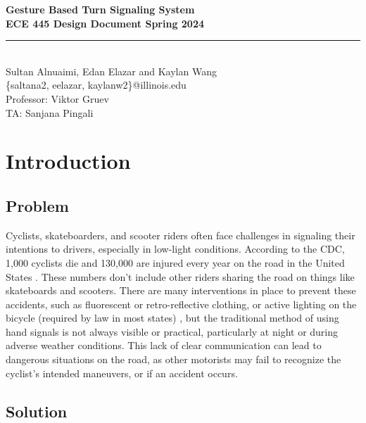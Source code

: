 \documentclass[12pt]{article}
\begin{document}
\begin{titlepage}
\centering
{}
{\LARGE\textbf{Gesture Based Turn Signaling System }}\\[1cm] 
{\large\textbf{ECE 445 Design Document Spring 2024}}\\[0.3cm]
\rule{\textwidth}{1pt}\\
{\Large Sultan Alnuaimi, Edan Elazar and Kaylan Wang}\\[0.5cm] 
{\small \{saltana2, eelazar, kaylanw2\}@illinois.edu}\\[0.5cm] 
{\small Professor: Viktor Gruev}\\[0.5cm]
{\small TA: Sanjana Pingali}\\[1cm]

\end{titlepage} 

\tableofcontents 
\newpage
\section{Introduction}
\subsection{Problem}
Cyclists, skateboarders, and scooter riders often face 
challenges in signaling their intentions to drivers,
especially in low-light conditions. According to the CDC, 
1,000 cyclists die and 130,000 are injured every year on 
the road in the United States \cite{CDC2024BicycleSafety}. 
These numbers don’t include other riders sharing the road on 
things like skateboards and scooters. There are many interventions 
in place to prevent these accidents, such as fluorescent or 
retro-reflective clothing, or active lighting on the bicycle 
(required by law in most states) \cite{CDC2024BicycleSafety}, 
but the traditional method of using hand signals is not always 
visible or practical, particularly at night or during adverse 
weather conditions. This lack of clear communication can lead 
to dangerous situations on the road, as other motorists may 
fail to recognize the cyclist's intended maneuvers, or if an 
accident occurs. 

\subsection{Solution}
\end{document}
